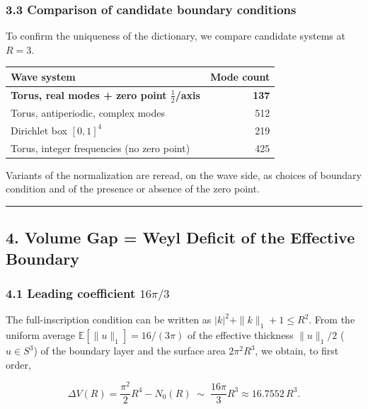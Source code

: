\documentclass[
]{article}
\newcounter{none} %
\begin{document}
\subsubsection{3.3 Comparison of candidate boundary
conditions}\label{comparison-of-candidate-boundary-conditions}

To confirm the uniqueness of the dictionary, we compare candidate
systems at \(R=3\).

{\def\LTcaptype{none} %
\begin{longtable}[]{@{}lr@{}}
\toprule\noalign{}
Wave system & Mode count \\
\midrule\noalign{}
\endhead
\bottomrule\noalign{}
\endlastfoot
\textbf{Torus, real modes + zero point \(\tfrac12\)/axis} &
\textbf{137} \\
Torus, antiperiodic, complex modes & 512 \\
Dirichlet box \([0,1]^4\) & 219 \\
Torus, integer frequencies (no zero point) & 425 \\
\end{longtable}
}

Variants of the normalization are reread, on the wave side, as choices
of boundary condition and of the presence or absence of the zero point.

\begin{center}\rule{0.5\linewidth}{0.5pt}\end{center}

\subsection{4. Volume Gap = Weyl Deficit of the Effective
Boundary}\label{volume-gap-weyl-deficit-of-the-effective-boundary}

\subsubsection{\texorpdfstring{4.1 Leading coefficient
\(16\pi/3\)}{4.1 Leading coefficient 16\textbackslash pi/3}}\label{leading-coefficient-16pi3}

The full-inscription condition can be written as
\(|k|^2+\|k\|_1+1\le R^2\). From the uniform average
\(\mathbb{E}[\|u\|_1]=16/(3\pi)\) of the effective thickness
\(\|u\|_1/2\) (\(u\in S^3\)) of the boundary layer and the surface area
\(2\pi^2R^3\), we obtain, to first order,

\[
\Delta V(R)=\frac{\pi^2}{2}R^4-N_0(R)\;\sim\;\frac{16\pi}{3}R^3\approx16.7552\,R^3.
\]
\end{document}
